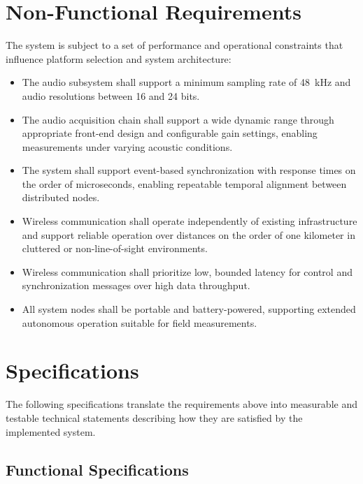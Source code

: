 \section{Non-Functional Requirements}

The system is subject to a set of performance and operational constraints that influence platform selection and system architecture:

\begin{itemize}
  \item The audio subsystem shall support a minimum sampling rate of 48~kHz and audio resolutions between 16 and 24 bits.

  \item The audio acquisition chain shall support a wide dynamic range through appropriate front-end design and configurable gain settings, enabling measurements under varying acoustic conditions.

  \item The system shall support event-based synchronization with response times on the order of microseconds, enabling repeatable temporal alignment between distributed nodes.

  \item Wireless communication shall operate independently of existing infrastructure and support reliable operation over distances on the order of one kilometer in cluttered or non-line-of-sight environments.

  \item Wireless communication shall prioritize low, bounded latency for control and synchronization messages over high data throughput.

  \item All system nodes shall be portable and battery-powered, supporting extended autonomous operation suitable for field measurements.
\end{itemize}

\section{Specifications}

The following specifications translate the requirements above into measurable and testable technical statements describing how they are satisfied by the implemented system.

\subsection{Functional Specifications}

